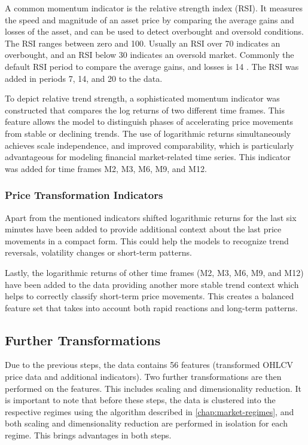 A common momentum indicator is the relative strength index (RSI).
It measures the speed and magnitude of an asset price by comparing the average gains and losses of the asset, and can be used to detect overbought and oversold conditions.
The RSI ranges between zero and 100.
Usually an RSI over 70 indicates an overbought, and an RSI below 30 indicates an oversold market.
Commonly the default RSI period to compare the average gains, and losses is 14 \cite{investopia-rsi}.
The RSI was added in periods 7, 14, and 20 to the data.

To depict relative trend strength, a sophisticated momentum indicator was constructed that compares the log returns of two different time frames.
This feature allows the model to distinguish phases of accelerating price movements from stable or declining trends.
The use of logarithmic returns simultaneously achieves scale independence, and improved comparability, which is particularly advantageous for modeling financial market-related time series.
This indicator was added for time frames M2, M3, M6, M9, and M12.

\subsubsection{Price Transformation Indicators}

Apart from the mentioned indicators shifted logarithmic returns for the last six minutes have been added to provide additional context about the last price movements in a compact form.
This could help the models to recognize trend reversals, volatility changes or short-term patterns.

Lastly, the logarithmic returns of other time frames (M2, M3, M6, M9, and M12) have been added to the data providing another more stable trend context which helps to correctly classify short-term price movements.
This creates a balanced feature set that takes into account both rapid reactions and long-term patterns.

\subsection{Further Transformations}

Due to the previous steps, the data contains 56 features (transformed OHLCV price data and additional indicators).
Two further transformations are then performed on the features.
This includes scaling and dimensionality reduction.
It is important to note that before these steps, the data is clustered into the respective regimes using the algorithm described in \autoref{chap:market-regimes}, and both scaling and dimensionality reduction are performed in isolation for each regime.
This brings advantages in both steps.

